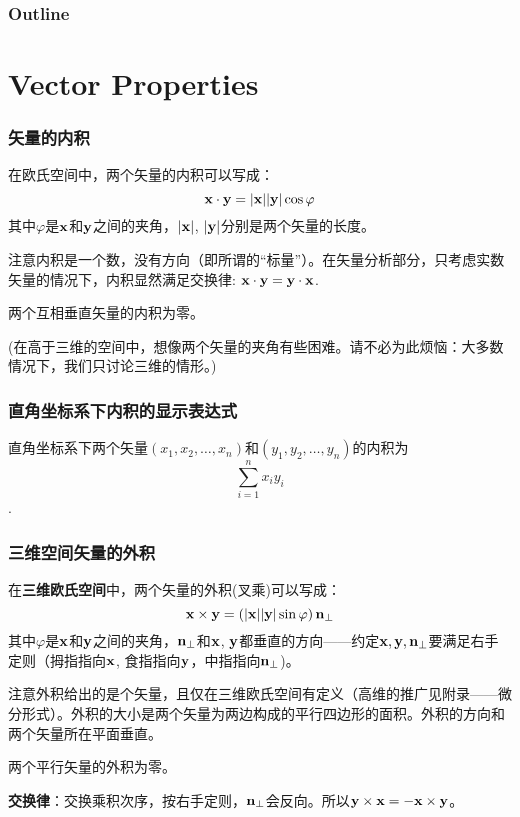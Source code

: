 \documentclass[CJK]{beamer}
\date{}
\begin{document}
  \bch
  

\begin{frame}
\frametitle{Outline}
\tableofcontents
\end{frame}


\section{Vector Properties}


\begin{frame}
  \frametitle{矢量的内积}
  在欧氏空间中，两个矢量的内积可以写成：
  $${\mathbf{x}}\cdot{\mathbf{y}} = \lvert{\mathbf{x}}\rvert\lvert{\mathbf{y}}\rvert\cos\varphi $$
  其中$\varphi$是${\mathbf{x}}$和${\mathbf{y}}$之间的夹角，$|{\mathbf{x}}|$, $|{\mathbf{y}}|$分别是两个矢量的长度。

  \skipline

  注意内积是一个数，没有方向（即所谓的“标量”）。在矢量分析部分，只考虑实数矢量的情况下，内积显然满足交换律: ${\mathbf{x}}\cdot{\mathbf{y}} = {\mathbf{y}}\cdot{\mathbf{x}}$.

  \skipline

  两个互相垂直矢量的内积为零。

  \skipline
  (在高于三维的空间中，想像两个矢量的夹角有些困难。请不必为此烦恼：大多数情况下，我们只讨论三维的情形。)
\end{frame}


\begin{frame}
  \frametitle{直角坐标系下内积的显示表达式}
  直角坐标系下两个矢量$(x_1, x_2, \ldots, x_n)$和$(y_1, y_2, \ldots, y_n)$的内积为
  $$\sum_{i=1}^n x_iy_i$$.
\end{frame}




\begin{frame}
  \frametitle{三维空间矢量的外积}
  在{\bf 三维欧氏空间}中，两个矢量的外积(叉乘)可以写成：
  $${\mathbf{x}} \times {\mathbf{y}} = \left( \lvert{\mathbf{x}}\rvert\lvert{\mathbf{y}}\rvert\sin\varphi\right) {\mathbf{n}}_{\perp}$$
  其中$\varphi$是${\mathbf{x}}$和${\mathbf{y}}$之间的夹角，${\mathbf{n}}_{\perp}$和${\mathbf{x}}$, ${\mathbf{y}}$都垂直的方向——约定${\mathbf{x}}, {\mathbf{y}}, {\mathbf{n}}_{\perp}$要满足右手定则（拇指指向${\mathbf{x}}$, 食指指向${\mathbf{y}}$，中指指向${\mathbf{n}}_{\perp}$)。

    \skipline

    注意外积给出的是个矢量，且仅在三维欧氏空间有定义（高维的推广见附录——微分形式）。外积的大小是两个矢量为两边构成的平行四边形的面积。外积的方向和两个矢量所在平面垂直。

    \skipline
    
    两个平行矢量的外积为零。

    \skipline
    
    {\bf 交换律}：交换乘积次序，按右手定则，${\mathbf{n}}_{\perp}$会反向。所以${\mathbf{y}} \times {\mathbf{x}}  = - {\mathbf{x}} \times {\mathbf{y}} $。
\end{frame}
\end{document}

